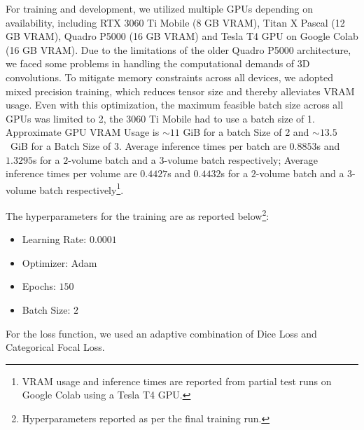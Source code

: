 {\sloppy
For training and development, we utilized multiple GPUs depending on availability, including RTX 3060 Ti Mobile (8 GB VRAM), Titan X Pascal (12 GB VRAM), Quadro P5000 (16 GB VRAM) and Tesla T4 GPU on Google Colab (16 GB VRAM). Due to the limitations of the older Quadro P5000 architecture, we faced some problems in handling the computational demands of 3D convolutions. To mitigate memory constraints across all devices, we adopted mixed precision training, which reduces tensor size and thereby alleviates VRAM usage. Even with this optimization, the maximum feasible batch size across all GPUs was limited to 2, the 3060 Ti Mobile had to use a batch size of 1. Approximate GPU VRAM Usage is $\sim11$ GiB for a batch Size of 2 and $\sim13.5$~GiB for a Batch Size of $3$. Average inference times per batch are $0.8853$s and $1.3295$s for a $2$-volume batch and a $3$-volume batch respectively; Average inference times per volume are $0.4427$s and $0.4432$s for a $2$-volume batch and a $3$-volume batch respectively\footnote{VRAM usage and inference times are reported from partial test runs on Google Colab using a Tesla T4 GPU.}.\par}

The hyperparameters for the training are as reported below\footnote{Hyperparameters reported as per the final training run.}:
\begin{itemize}
    \item Learning Rate: $0.0001$
    \item Optimizer: Adam
    \item Epochs: $150$
    \item Batch Size: $2$
\end{itemize}

For the loss function, we used an adaptive combination of Dice Loss and Categorical Focal Loss.

